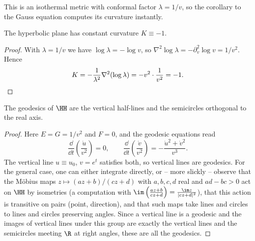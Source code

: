 This is an isothermal metric with conformal factor $\lambda = 1/v$, so the corollary to the Gauss equation computes its curvature instantly.

\begin{proposition}
    The hyperbolic plane has constant curvature $K \equiv -1$.
\end{proposition}
\begin{proof}
    With $\lambda = 1/v$ we have $\log\lambda = -\log v$, so $\nabla^2\log\lambda = -\partial_v^2\log v = 1/v^2$. Hence
    $$
    K = -\frac{1}{\lambda^2}\nabla^2(\log\lambda) = -v^2\cdot\frac{1}{v^2} = -1. \qedhere
    $$
\end{proof}

\begin{proposition}
    The geodesics of $\HH$ are the vertical half-lines and the semicircles orthogonal to the real axis.
\end{proposition}
\begin{proof}
    Here $E = G = 1/v^2$ and $F = 0$, and the geodesic equations read
    $$
    \frac{\dd}{\dd t}\left(\frac{\dot u}{v^2}\right) = 0, \qquad \frac{\dd}{\dd t}\left(\frac{\dot v}{v^2}\right) = -\frac{\dot u^2 + \dot v^2}{v^3}.
    $$
    The vertical line $u \equiv u_0$, $v = e^t$ satisfies both, so vertical lines are geodesics. For the general case, one can either integrate directly, or -- more slickly -- observe that the M\"obius maps $z \mapsto (az+b)/(cz+d)$ with $a,b,c,d$ real and $ad-bc>0$ act on $\HH$ by isometries (a computation with $\im\left(\frac{az+b}{cz+d}\right) = \frac{\im z}{|cz+d|^2}$), that this action is transitive on pairs (point, direction), and that such maps take lines and circles to lines and circles preserving angles. Since a vertical line is a geodesic and the images of vertical lines under this group are exactly the vertical lines and the semicircles meeting $\R$ at right angles, these are all the geodesics.
\end{proof}

\begin{center}
\end{center}

